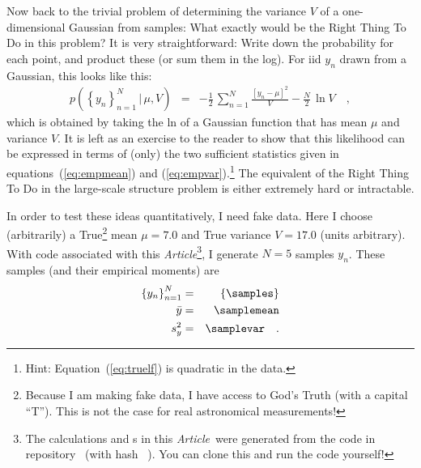\documentclass[12pt, letterpaper, preprint]{aastex}
\newcommand{\setof}[1]{\left\{{#1}\right\}}
\newcommand{\given}{\,|\,}
\newcommand{\documentname}{\textsl{Article}}
\begin{document}
Now back to the trivial problem of determining the variance $V$ of a
one-dimensional Gaussian from samples:
What exactly would be the Right Thing To Do in this problem?
It is very straightforward:
Write down the probability for each point, and product these
(or sum them in the log).
For iid $y_n$ drawn from a Gaussian, this looks like this:
\begin{eqnarray}
p(\setof{y_n}_{n=1}^N\given \mu,V) &=& -\frac{1}{2}\,\sum_{n=1}^N \frac{[y_n - \mu]^2}{V} - \frac{N}{2}\,\ln V
\label{eq:truelf}\quad ,
\end{eqnarray}
which is obtained by taking the ln of a Gaussian function that has
mean $\mu$ and variance $V$.
It is left as an exercise to the reader to show that this likelihood
can be expressed in terms of (only) the two sufficient statistics given
in equations~(\ref{eq:empmean}) and (\ref{eq:empvar}).\footnote{Hint:
  Equation~(\ref{eq:truelf}) is quadratic in the data.}
The equivalent of the Right Thing To Do in the large-scale
structure problem is either extremely hard or intractable.

In order to test these ideas quantitatively, I need fake data.
Here I choose (arbitrarily) a True\footnote{Because I am making
  fake data, I have access to God's Truth (with a capital
  ``T''). This is not the case for real astronomical measurements!}
mean $\mu=7.0$ and True variance $V=17.0$ (units arbitrary).
With code associated with this \documentname\footnote{The calculations
  and \figurename s in this \documentname\ were generated from the code in
  repository \giturl\ (with hash \texttt{\githash~\gitdate}). You can
  clone this and run the code yourself!}, I generate $N=5$ samples
$y_n$.
These samples (and their empirical moments) are
\begin{eqnarray}
\setof{y_n}_{n=1}^N &=& \setof{\samples}
\label{eq:data}\\
\bar{y} &=& \samplemean
\\
s^2_y &=& \samplevar
\quad .
\end{eqnarray}
\end{document}
